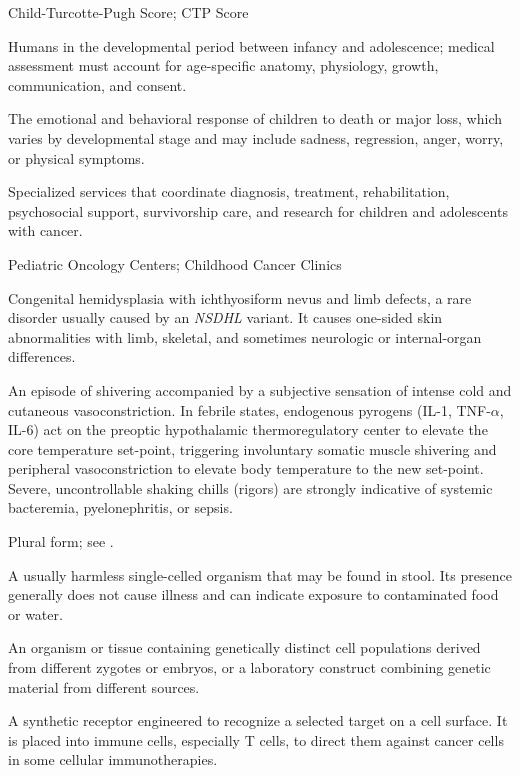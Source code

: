 \synonyms
Child-Turcotte-Pugh Score; CTP Score

 Humans in the developmental period between infancy and adolescence; medical assessment must account for age-specific anatomy, physiology, growth, communication, and consent.

 The emotional and behavioral response of children to death or major loss, which varies by developmental stage and may include sadness, regression, anger, worry, or physical symptoms.

 Specialized services that coordinate diagnosis, treatment, rehabilitation, psychosocial support, survivorship care, and research for children and adolescents with cancer.

\synonyms
Pediatric Oncology Centers; Childhood Cancer Clinics

 Congenital hemidysplasia with ichthyosiform nevus and limb defects, a rare disorder usually caused by an \textit{NSDHL} variant. It causes one-sided skin abnormalities with limb, skeletal, and sometimes neurologic or internal-organ differences.

 An episode of shivering accompanied by a subjective sensation of intense cold and cutaneous vasoconstriction. In febrile states, endogenous pyrogens (IL-1, TNF-$\alpha$, IL-6) act on the preoptic hypothalamic thermoregulatory center to elevate the core temperature set-point, triggering involuntary somatic muscle shivering and peripheral vasoconstriction to elevate body temperature to the new set-point. Severe, uncontrollable shaking chills (rigors) are strongly indicative of systemic bacteremia, pyelonephritis, or sepsis.

 Plural form; see .

 A usually harmless single-celled organism that may be found in stool. Its presence generally does not cause illness and can indicate exposure to contaminated food or water.

 An organism or tissue containing genetically distinct cell populations derived from different zygotes or embryos, or a laboratory construct combining genetic material from different sources.

 A synthetic receptor engineered to recognize a selected target on a cell surface. It is placed into immune cells, especially T cells, to direct them against cancer cells in some cellular immunotherapies.

